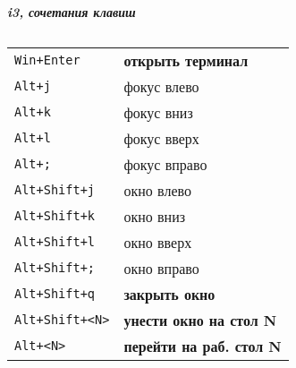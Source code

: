 




\raggedright
\footnotesize

\begin{center}
    \Large{\textbf{\textit{i3, сочетания клавиш}}} \\
\end{center}
\vspace*{0.5cm}

\begin{multicols}{3}


\setlength{\premulticols}{1pt}
\setlength{\postmulticols}{1pt}
\setlength{\multicolsep}{1pt}
\setlength{\columnsep}{2pt}

\section{}
\begin{tabular}{@{}ll@{}}
    \verb!Win+Enter! &  \textbf{открыть терминал} \\
    \verb!Alt+j! & фокус влево \\
    \verb!Alt+k! & фокус вниз \\
    \verb!Alt+l! & фокус вверх \\
    \verb!Alt+;! & фокус вправо \\
    \verb!Alt+Shift+j! & окно влево \\
    \verb!Alt+Shift+k! & окно вниз \\
    \verb!Alt+Shift+l! & окно вверх \\
    \verb!Alt+Shift+;! & окно вправо \\
    \verb!Alt+Shift+q! & \textbf{закрыть окно} \\
    \verb!Alt+Shift+<N>! & \textbf{унести окно на стол N} \\
    \verb!Alt+<N>! & \textbf{перейти на раб. стол N} \\
\end{tabular}


\end{multicols}
